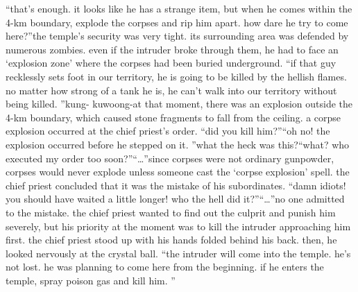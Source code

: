 “that’s enough.
 it looks like he has a strange item, but when he comes within the 4-km boundary, explode the corpses and rip him apart.
 how dare he try to come here?”the temple’s security was very tight.
 its surrounding area was defended by numerous zombies.
 even if the intruder broke through them, he had to face an ‘explosion zone’ where the corpses had been buried underground.
“if that guy recklessly sets foot in our territory, he is going to be killed by the hellish flames.
 no matter how strong of a tank he is, he can’t walk into our territory without being killed.
”kung- kuwoong-at that moment, there was an explosion outside the 4-km boundary, which caused stone fragments to fall from the ceiling.
 a corpse explosion occurred at the chief priest’s order.
“did you kill him?”“oh no! the explosion occurred before he stepped on it.
”what the heck was this?“what? who executed my order too soon?”“…”since corpses were not ordinary gunpowder, corpses would never explode unless someone cast the ‘corpse explosion’ spell.
 the chief priest concluded that it was the mistake of his subordinates.
“damn idiots! you should have waited a little longer! who the hell did it?”“…”no one admitted to the mistake.
 the chief priest wanted to find out the culprit and punish him severely, but his priority at the moment was to kill the intruder approaching him first.
the chief priest stood up with his hands folded behind his back.
then, he looked nervously at the crystal ball.
“the intruder will come into the temple.
 he’s not lost.
 he was planning to come here from the beginning.
 if he enters the temple, spray poison gas and kill him.
”

 